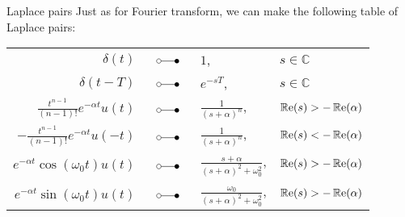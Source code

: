 \documentclass[a4paper]{article}
\begin{document}
\begin{parag}{Laplace pairs}
    Just as for Fourier transform, we can make the following table of Laplace pairs:
    \begin{center}
    \begin{tabular}{|rcll|}
        \hline
        $\displaystyle \delta\left(t\right)$ & $\laplacepair$ & $\displaystyle 1$, & $s \in \mathbb{C}$ \\
        $\displaystyle \delta\left(t - T\right)$ & $\laplacepair$ & $\displaystyle e^{-sT}$, & $s \in \mathbb{C}$ \\
        \hline
        $\displaystyle \frac{t^{n-1}}{\left(n-1\right)!} e^{-\alpha t} u\left(t\right)$ & $\laplacepair$ & $\displaystyle \frac{1}{\left(s + \alpha\right)^n}$, & $\cre\left(s\right) > -\cre\left(\alpha\right)$ \\
        $\displaystyle -\frac{t^{n-1}}{\left(n-1\right)!} e^{-\alpha t} u\left(-t\right)$ & $\laplacepair$ & $\displaystyle \frac{1}{\left(s + \alpha\right)^n}$, & $\cre\left(s\right) < -\cre\left(\alpha\right)$ \\
        \hline
        $\displaystyle e^{-\alpha t} \cos\left(\omega_0 t\right) u\left(t\right)$ & $\laplacepair$ & $\displaystyle \frac{s + \alpha}{\left(s + \alpha\right)^2 + \omega_0^2}$, & $\cre\left(s\right) > -\cre\left(\alpha\right)$ \\
        $\displaystyle e^{-\alpha t} \sin\left(\omega_0 t\right) u\left(t\right)$ & $\laplacepair$ & $\displaystyle \frac{\omega_0}{\left(s + \alpha\right)^2 + \omega_0^2}$, & $\cre\left(s\right) > -\cre\left(\alpha\right)$ \\
        \hline
    \end{tabular}
    \end{center}
\end{parag}
\end{document}
